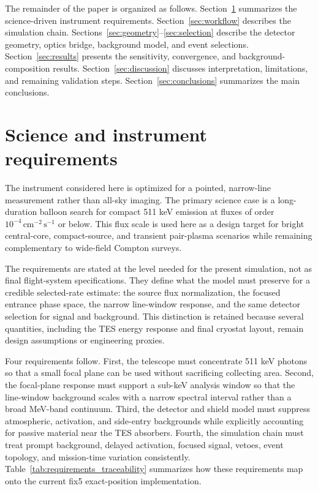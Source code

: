 \documentclass[preprint,12pt]{elsarticle}
\newcommand{\cms}{\,\mathrm{cm^{-2}\,s^{-1}}}
\begin{document}
The remainder of the paper is organized as follows. Section~\ref{sec:requirements} summarizes the science-driven instrument requirements. Section~\ref{sec:workflow} describes the simulation chain. Sections~\ref{sec:geometry}--\ref{sec:selection} describe the detector geometry, optics bridge, background model, and event selections. Section~\ref{sec:results} presents the sensitivity, convergence, and background-composition results. Section~\ref{sec:discussion} discusses interpretation, limitations, and remaining validation steps. Section~\ref{sec:conclusions} summarizes the main conclusions.

\section{Science and instrument requirements}
\label{sec:requirements}

The instrument considered here is optimized for a pointed, narrow-line measurement rather than all-sky imaging. The primary science case is a long-duration balloon search for compact 511 keV emission at fluxes of order $10^{-4}\cms$ or below. This flux scale is used here as a design target for bright central-core, compact-source, and transient pair-plasma scenarios while remaining complementary to wide-field Compton surveys.

The requirements are stated at the level needed for the present simulation, not as final flight-system specifications. They define what the model must preserve for a credible selected-rate estimate: the source flux normalization, the focused entrance phase space, the narrow line-window response, and the same detector selection for signal and background. This distinction is retained because several quantities, including the TES energy response and final cryostat layout, remain design assumptions or engineering proxies.

Four requirements follow. First, the telescope must concentrate 511 keV photons so that a small focal plane can be used without sacrificing collecting area. Second, the focal-plane response must support a sub-keV analysis window so that the line-window background scales with a narrow spectral interval rather than a broad MeV-band continuum. Third, the detector and shield model must suppress atmospheric, activation, and side-entry backgrounds while explicitly accounting for passive material near the TES absorbers. Fourth, the simulation chain must treat prompt background, delayed activation, focused signal, vetoes, event topology, and mission-time variation consistently. Table~\ref{tab:requirements_traceability} summarizes how these requirements map onto the current fix5 exact-position implementation.
\end{document}

